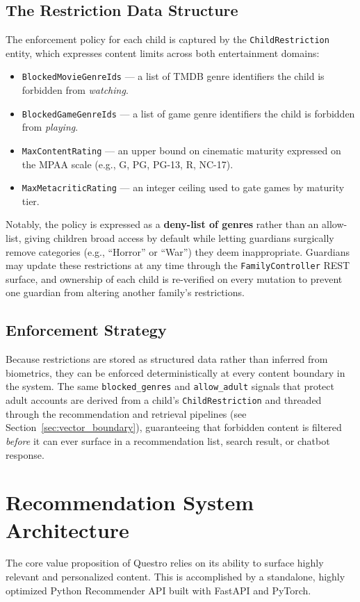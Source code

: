\subsection{The Restriction Data Structure}
The enforcement policy for each child is captured by the \texttt{Child\allowbreak Restriction} entity, which expresses content limits across both entertainment domains:
\begin{itemize}
    \item \texttt{BlockedMovieGenreIds} --- a list of TMDB genre identifiers the child is forbidden from \textit{watching}.
    \item \texttt{BlockedGameGenreIds} --- a list of game genre identifiers the child is forbidden from \textit{playing}.
    \item \texttt{MaxContentRating} --- an upper bound on cinematic maturity expressed on the MPAA scale (e.g., G, PG, PG-13, R, NC-17).
    \item \texttt{MaxMetacriticRating} --- an integer ceiling used to gate games by maturity tier.
\end{itemize}
Notably, the policy is expressed as a \textbf{deny-list of genres} rather than an allow-list, giving children broad access by default while letting guardians surgically remove categories (e.g., ``Horror'' or ``War'') they deem inappropriate. Guardians may update these restrictions at any time through the \texttt{FamilyController} REST surface, and ownership of each child is re-verified on every mutation to prevent one guardian from altering another family's restrictions.

\subsection{Enforcement Strategy}
Because restrictions are stored as structured data rather than inferred from biometrics, they can be enforced deterministically at every content boundary in the system. The same \texttt{blocked\_genres} and \texttt{allow\_adult} signals that protect adult accounts are derived from a child's \texttt{ChildRestriction} and threaded through the recommendation and retrieval pipelines (see Section~\ref{sec:vector_boundary}), guaranteeing that forbidden content is filtered \textit{before} it can ever surface in a recommendation list, search result, or chatbot response.

\section{Recommendation System Architecture}
The core value proposition of Questro relies on its ability to surface highly relevant and personalized content. This is accomplished by a standalone, highly optimized Python Recommender API built with FastAPI and PyTorch.

